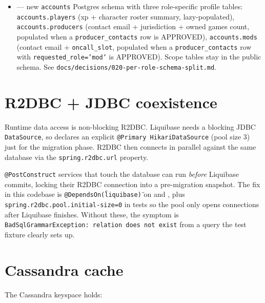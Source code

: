 \begin{itemize}
        rejection without clobbering history. See
         for the REST surface.
  \item {} —
        new \texttt{accounts} Postgres schema with three role-specific
        profile tables: \texttt{accounts.players} (xp + character
        roster summary, lazy-populated), \texttt{accounts.producers}
        (contact email + jurisdiction + owned games count, populated
        when a \texttt{producer\_contacts} row is APPROVED),
        \texttt{accounts.mods} (contact email + \texttt{oncall\_slot},
        populated when a \texttt{producer\_contacts} row with
        \texttt{requested\_role='mod'} is APPROVED). Scope tables stay
        in the public schema. See \texttt{docs/decisions/020-per-role-schema-split.md}.
\end{itemize}

\section{R2DBC + JDBC coexistence}

Runtime data access is non-blocking R2DBC. Liquibase needs a blocking
JDBC \texttt{DataSource}, so  declares an
explicit \texttt{@Primary HikariDataSource} (pool size 3) just for the
migration phase. R2DBC then connects in parallel against the same
database via the \texttt{spring.r2dbc.url} property.

\begin{snapcaution}[title={MVCC snapshot race}]
\texttt{@PostConstruct} services that touch the database can run
\emph{before} Liquibase commits, locking their R2DBC connection into a
pre-migration snapshot. The fix in this codebase is \texttt{@DependsOn(\"liquibase\")}
on  and , plus
\texttt{spring.r2dbc.pool.initial-size=0} in tests so the pool only opens
connections after Liquibase finishes. Without these, the symptom is
\texttt{BadSqlGrammarException: relation does not exist} from a query
the test fixture clearly sets up.
\end{snapcaution}

\section{Cassandra cache}

The Cassandra keyspace holds:

